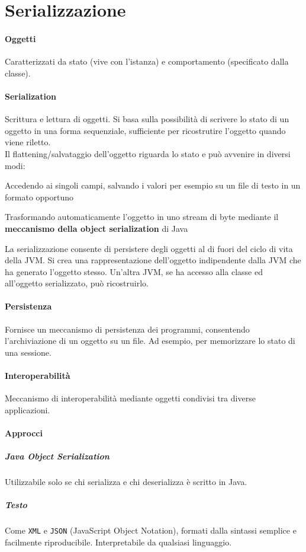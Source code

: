 \documentclass[10pt]{article}
\begin{document}
\section{Serializzazione}
\paragraph{Oggetti} Caratterizzati da stato (vive con l'istanza) e comportamento (specificato dalla classe).
\paragraph{Serialization} Scrittura e lettura di oggetti. Si basa sulla possibilità di scrivere lo stato di un oggetto in una forma sequenziale, sufficiente per ricostrutire l'oggetto quando viene riletto.\\
Il flattening/salvataggio dell'oggetto riguarda lo stato e può avvenire in diversi modi:
\begin{list}{}{}
	\item Accedendo ai singoli campi, salvando i valori per esempio su un file di testo in un formato opportuno
	\item Trasformando automaticamente l'oggetto in uno stream di byte mediante il \textbf{meccanismo della object serialization} di Java
\end{list}
La serializzazione consente di persistere degli oggetti al di fuori del ciclo di vita della JVM. Si crea una rappresentazione dell'oggetto indipendente dalla JVM che ha generato l'oggetto stesso. Un'altra JVM, se ha accesso alla classe ed all'oggetto serializzato, può ricostruirlo.
\paragraph{Persistenza} Fornisce un meccanismo di persistenza dei programmi, consentendo l'archiviazione di un oggetto su un file. Ad esempio, per memorizzare lo stato di una sessione.
\paragraph{Interoperabilità} Meccanismo di interoperabilità mediante oggetti condivisi tra diverse applicazioni.
\paragraph{Approcci}
\subparagraph{Java Object Serialization} Utilizzabile solo se chi serializza e chi deserializza è scritto in Java.
\subparagraph{Testo} Come \texttt{XML} e \texttt{JSON} (JavaScript Object Notation), formati dalla sintassi semplice e facilmente riproducibile. Interpretabile da qualsiasi linguaggio.
\end{document}
